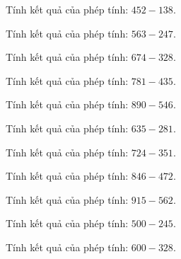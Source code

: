 \begin{ex}
Tính kết quả của phép tính: $452 - 138$.
\end{ex}

\begin{ex}
Tính kết quả của phép tính: $563 - 247$.
\end{ex}

\begin{ex}
Tính kết quả của phép tính: $674 - 328$.
\end{ex}

\begin{ex}
Tính kết quả của phép tính: $781 - 435$.
\end{ex}

\begin{ex}
Tính kết quả của phép tính: $890 - 546$.
\end{ex}

\begin{ex}
Tính kết quả của phép tính: $635 - 281$.
\end{ex}

\begin{ex}
Tính kết quả của phép tính: $724 - 351$.
\end{ex}

\begin{ex}
Tính kết quả của phép tính: $846 - 472$.
\end{ex}

\begin{ex}
Tính kết quả của phép tính: $915 - 562$.
\end{ex}

\begin{ex}
Tính kết quả của phép tính: $500 - 245$.
\end{ex}

\begin{ex}
Tính kết quả của phép tính: $600 - 328$.
\end{ex}

